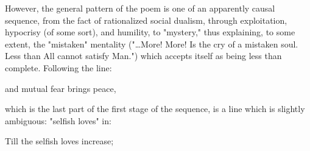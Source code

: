 \hspace*{5mm}However, the general pattern of the poem is one of an apparently causal sequence, from the fact of rationalized social dualism,
through exploitation, hypocrisy (of some sort), and humility, to "mystery," thus explaining, to some extent,
the "mistaken" mentality ("\dots More! More! Is the cry of a mistaken soul. Less than All cannot satisfy Man.") which accepts itself as being
less than complete. Following the line:\par
\begin{center}
	\parbox{0.8\textwidth}{
		\centering
		and mutual fear brings peace,
	}%
\end{center}
which is the last part of the first stage of the sequence, is a line which is slightly ambiguous: "selfish loves" in:
\begin{center}
	\parbox{0.8\textwidth}{
		\centering
		Till the selfish loves increase;
	}%
\end{center}

\newpage

